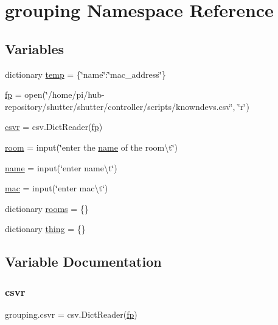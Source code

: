 \hypertarget{namespacegrouping}{}\section{grouping Namespace Reference}
\label{namespacegrouping}
\subsection*{Variables}
\begin{DoxyCompactItemize}
\item 
dictionary \hyperlink{namespacegrouping_ab285836ed4f2e156c7d0586c09327d15}{temp} = \{\char`\"{}name\char`\"{}\+:\char`\"{}mac\+\_\+address\char`\"{}\}
\item 
\hyperlink{namespacegrouping_a1160ca96fae06497787f492dd59fd401}{fp} = open(\char`\"{}/home/pi/hub-\/repository/shutter/shutter/controller/scripts/knowndevs.\+csv\char`\"{}, \char`\"{}r\char`\"{})
\item 
\hyperlink{namespacegrouping_a313a71c2ab12b5cb7007275f75957d6b}{csvr} = csv.\+Dict\+Reader(\hyperlink{namespacegrouping_a1160ca96fae06497787f492dd59fd401}{fp})
\item 
\hyperlink{namespacegrouping_ae83727fc9263bcd0288368f3e0fa288b}{room} = input(\char`\"{}enter the \hyperlink{namespacegrouping_abb4abfe957716dd9a69fed292a1b0756}{name} of the room\textbackslash{}t\char`\"{})
\item 
\hyperlink{namespacegrouping_abb4abfe957716dd9a69fed292a1b0756}{name} = input(\char`\"{}enter name\textbackslash{}t\char`\"{})
\item 
\hyperlink{namespacegrouping_a64d1c2fe38f97c2f87e5197c25bcdc19}{mac} = input(\char`\"{}enter mac\textbackslash{}t\char`\"{})
\item 
dictionary \hyperlink{namespacegrouping_add8a745f5adf630b408f7ab91486f52e}{rooms} = \{\}
\item 
dictionary \hyperlink{namespacegrouping_a646b87aea7457f792ab28e29af01eec6}{thing} = \{\}
\end{DoxyCompactItemize}


\subsection{Variable Documentation}
\mbox{\label{namespacegrouping_a313a71c2ab12b5cb7007275f75957d6b}} 
\subsubsection{\texorpdfstring{csvr}{csvr}}
{\footnotesize\ttfamily grouping.\+csvr = csv.\+Dict\+Reader(\hyperlink{namespacegrouping_a1160ca96fae06497787f492dd59fd401}{fp})}

